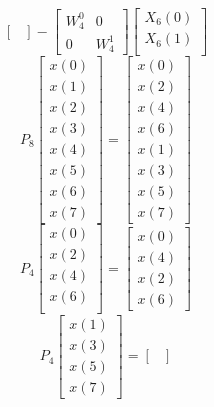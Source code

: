 \documentclass[journal,12pt,twocolumn]{IEEEtran}
\numberwithin{equation}{section}
\renewcommand\thesection{\arabic{section}}
\begin{document}
\begin{enumerate}[label=\arabic*.,ref=\thesection.\theenumi]
\begin{equation}
\begin{bmatrix}
\end{bmatrix}
-
\begin{bmatrix}
W^{0}_{4} & 0\\
0 & W^{1}_{4}
\end{bmatrix}
\begin{bmatrix}
X_{6}(0) \\ 
X_{6}(1) \\ 
\end{bmatrix}
\end{equation}
\begin{equation}
P_{8}
\begin{bmatrix}
x(0) \\ 
x(1) \\ 
x(2) \\ 
x(3) \\ 
x(4) \\ 
x(5) \\
x(6) \\
x(7)
\end{bmatrix}
 = 
\begin{bmatrix}
x(0) \\ 
x(2) \\ 
x(4) \\ 
x(6) \\
x(1) \\ 
x(3) \\ 
x(5) \\
x(7)
\end{bmatrix}
\end{equation}
\begin{equation}
P_{4}
\begin{bmatrix}
x(0) \\ 
x(2) \\ 
x(4) \\ 
x(6) \\
\end{bmatrix}
 = 
\begin{bmatrix}
x(0) \\ 
x(4) \\ 
x(2) \\
x(6)
\end{bmatrix}
\end{equation}
\begin{equation}
P_{4}
\begin{bmatrix}
x(1) \\ 
x(3) \\ 
x(5) \\
x(7)
\end{bmatrix}
 = 
\begin{bmatrix}

\end{bmatrix}
\end{equation}
\end{enumerate}
\end{document}
